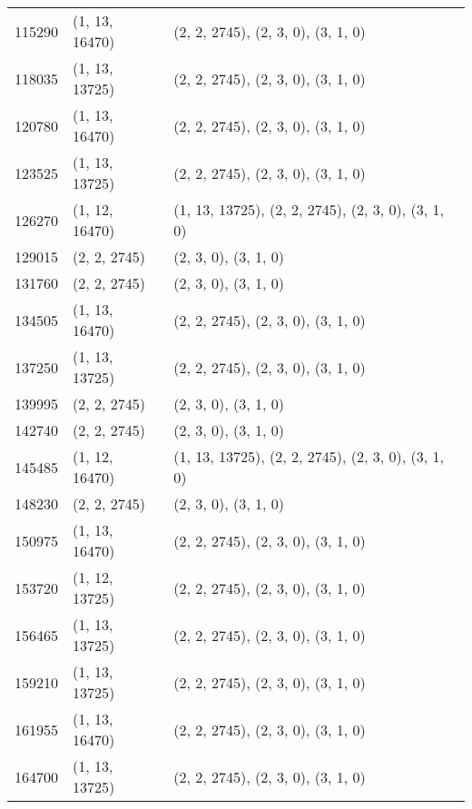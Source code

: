 \begin{longtable}{@{\extracolsep{\fill}}lll}
  115290             & (1, 13, 16470)              & (2, 2, 2745), (2, 3, 0), (3, 1, 0)                  \\
  118035             & (1, 13, 13725)              & (2, 2, 2745), (2, 3, 0), (3, 1, 0)                  \\
  120780             & (1, 13, 16470)              & (2, 2, 2745), (2, 3, 0), (3, 1, 0)                  \\
  123525             & (1, 13, 13725)              & (2, 2, 2745), (2, 3, 0), (3, 1, 0)                  \\
  126270             & (1, 12, 16470)              & (1, 13, 13725), (2, 2, 2745), (2, 3, 0), (3, 1, 0)  \\
  129015             & (2, 2, 2745)                & (2, 3, 0), (3, 1, 0)                                \\
  131760             & (2, 2, 2745)                & (2, 3, 0), (3, 1, 0)                                \\
  134505             & (1, 13, 16470)              & (2, 2, 2745), (2, 3, 0), (3, 1, 0)                  \\
  137250             & (1, 13, 13725)              & (2, 2, 2745), (2, 3, 0), (3, 1, 0)                  \\
  139995             & (2, 2, 2745)                & (2, 3, 0), (3, 1, 0)                                \\
  142740             & (2, 2, 2745)                & (2, 3, 0), (3, 1, 0)                                \\
  145485             & (1, 12, 16470)              & (1, 13, 13725), (2, 2, 2745), (2, 3, 0), (3, 1, 0)  \\
  148230             & (2, 2, 2745)                & (2, 3, 0), (3, 1, 0)                                \\
  150975             & (1, 13, 16470)              & (2, 2, 2745), (2, 3, 0), (3, 1, 0)                  \\
  153720             & (1, 12, 13725)              & (2, 2, 2745), (2, 3, 0), (3, 1, 0)                  \\
  156465             & (1, 13, 13725)              & (2, 2, 2745), (2, 3, 0), (3, 1, 0)                  \\
  159210             & (1, 13, 13725)              & (2, 2, 2745), (2, 3, 0), (3, 1, 0)                  \\
  161955             & (1, 13, 16470)              & (2, 2, 2745), (2, 3, 0), (3, 1, 0)                  \\
  164700             & (1, 13, 13725)              & (2, 2, 2745), (2, 3, 0), (3, 1, 0)                  \\
\end{longtable}


